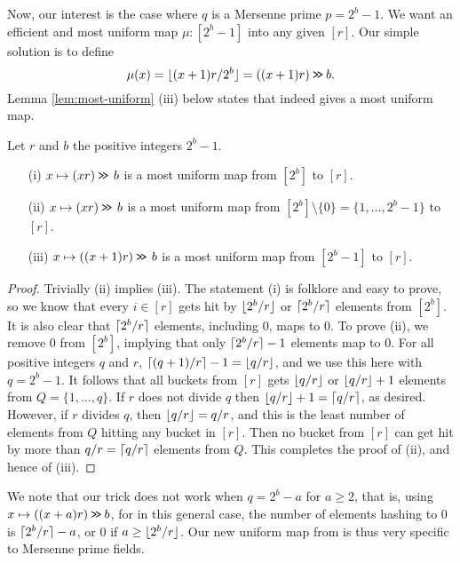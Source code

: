 Now, our interest is the case where $q$ is a Mersenne prime $p=2^b-1$. We want
an efficient and most uniform map $\mu:[2^b-1]$ into any given $[r]$.
Our simple solution is to define
\begin{equation}\label{eq:most-uniform}
   \mu(x)=\lfloor {(x+1)r/2^b} \rfloor=((x+1)r)\mathbin{\texttt{>\!>}} b.
\end{equation}
Lemma \ref{lem:most-uniform} (iii) below 
states that  indeed
gives a most uniform map. 
\begin{lemma}\label{lem:most-uniform} Let $r$ and $b$ the positive integers
   $2^b-1$. 
   \begin{itemize}
      \item[(i)] $x\mapsto (xr)\mathbin{\texttt{>\!>}}\,b$ is a most
         uniform map from $[2^b]$ to $[r]$.
      \item[(ii)] $x\mapsto (xr)\mathbin{\texttt{>\!>}}\,b$ is a most
         uniform map from $[2^b]\setminus\{0\}=\{1,\ldots,2^b-1\}$ to $[r]$.
      \item[(iii)] $x\mapsto ((x+1)r)\mathbin{\texttt{>\!>}} \, b$ is a most
         uniform map from $[2^b-1]$ to $[r]$.
   \end{itemize}
\end{lemma}
\begin{proof}
   Trivially (ii) implies (iii). 
   The statement (i) is folklore and easy to prove, so we know that every
   $i\in[r]$ gets hit by $\lfloor {2^b/r} \rfloor$ or $\lceil {2^b/r}\rceil$ elements from
   $[2^b]$. It is also clear that $\lceil {2^b/r}\rceil$ elements, including $0$,
   maps to $0$. To prove (ii), we remove $0$ from $[2^b]$, 
   implying that only
   $\lceil {2^b/r}\rceil-1$ elements map to $0$. For all positive integers $q$
   and $r$, $\lceil {(q+1)/r}\rceil-1=\lfloor {q/r} \rfloor$, and we use this here with 
   $q=2^b-1$. It follows that all buckets from $[r]$ gets $\lfloor {q/r} \rfloor$
   or $\lfloor {q/r} \rfloor+1$ elements from $Q=\{1,\ldots,q\}$. If $r$ does
   not divide $q$ then $\lfloor {q/r} \rfloor+1=\lceil {q/r}\rceil$, as desired. However,
   if $r$ divides $q$, then $\lfloor {q/r} \rfloor=q/r$, and this
   is the least number of elements from $Q$ hitting any bucket in $[r]$. Then 
   no bucket from $[r]$ can get hit by more than $q/r=\lceil {q/r}\rceil$ 
   elements from $Q$. This completes the proof of (ii), and hence of (iii).
\end{proof}
We note that our trick does not work when $q=2^b-a$ for $a\geq 2$, that is,
using $x\mapsto ((x+a)r)\mathbin{\texttt{>\!>}}  b$, for in this general case, 
the number of elements hashing to $0$ is $\lceil {2^b/r}\rceil-a$, or $0$ if
$a\geq \lfloor {2^b/r} \rfloor$. Our new uniform map from 
is thus very specific to Mersenne prime fields.

